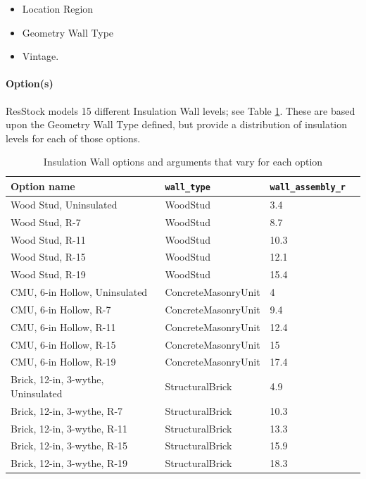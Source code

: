 \begin{itemize}
    \item Location Region
    \item Geometry Wall Type
    \item Vintage.
\end{itemize}
\paragraph{Option(s)}
ResStock models 15 different Insulation Wall levels; see Table \ref{table:hc_ins_wall}. These are based upon the Geometry Wall Type defined, but provide a distribution of insulation levels for each of those options.

\begin{longtable}[]{|p{5.5cm}|p{4cm}|p{3.2cm}|p{3cm}|} \caption{Insulation Wall options and arguments that vary for each option} \label{table:hc_ins_wall} \\  
\toprule\noalign{}
Option name & \texttt{wall\_type} &
\texttt{wall\_assembly\_r} \\
\midrule\noalign{}
\endhead
\bottomrule\noalign{}
\endlastfoot
Wood Stud, Uninsulated & WoodStud & 3.4 \\
Wood Stud, R-7 & WoodStud & 8.7 \\
Wood Stud, R-11 & WoodStud & 10.3 \\
Wood Stud, R-15 & WoodStud & 12.1 \\
Wood Stud, R-19 & WoodStud & 15.4 \\
CMU, 6-in Hollow, Uninsulated & ConcreteMasonryUnit & 4 \\
CMU, 6-in Hollow, R-7 & ConcreteMasonryUnit & 9.4 \\
CMU, 6-in Hollow, R-11 & ConcreteMasonryUnit & 12.4 \\
CMU, 6-in Hollow, R-15 & ConcreteMasonryUnit & 15 \\
CMU, 6-in Hollow, R-19 & ConcreteMasonryUnit & 17.4 \\
Brick, 12-in, 3-wythe, Uninsulated & StructuralBrick & 4.9 \\
Brick, 12-in, 3-wythe, R-7 & StructuralBrick & 10.3 \\
Brick, 12-in, 3-wythe, R-11 & StructuralBrick & 13.3 \\
Brick, 12-in, 3-wythe, R-15 & StructuralBrick & 15.9 \\
Brick, 12-in, 3-wythe, R-19 & StructuralBrick & 18.3 \\
\end{longtable}

